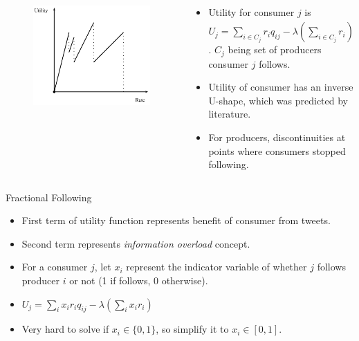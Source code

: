 \documentclass[aspectratio=169]{beamer}
\newcommand{\bi}{\begin{itemize}}
\newcommand{\ei}{\end{itemize}}
\begin{document}
\begin{frame}
\begin{columns}[T]
\begin{column}{0.2\textwidth}
\begin{figure}[!ht]
                \includegraphics[scale=0.1]{./figures/follow_celeb_utility.png}
            \end{figure}
        \end{column}
        \begin{column}{0.4\textwidth}
            \pause
            \bi
    \item Utility for consumer $j$ is $U_{j} = \sum_{i \in C_j}r_{i}q_{ij} - \lambda (\sum_{i
                \in C_{j}}r_{i})^2$. $C_j$ being set of producers consumer $j$ follows.
            \pause
        \item Utility of consumer has an inverse U-shape, which was predicted by
            literature.
            \pause
        \item For producers, discontinuities at points where consumers stopped
            following.
            \ei
        \end{column}
    \end{columns}
\end{frame}

\begin{frame}{Fractional Following}
    \bi
\item First term of utility function represents benefit of consumer from tweets.
    \pause
\item Second term represents \textit{information overload} concept.
    \pause
\item For a consumer $j$, let $x_i$ represent the indicator variable of whether
    $j$ follows producer $i$ or not (1 if follows, 0 otherwise).
    \pause
\item $U_j = \sum_{i}x_i r_i q_{ij} - \lambda (\sum_{i}x_i r_i)$
    \pause
\item Very hard to solve if $x_i \in \{0, 1\}$, so simplify it to $x_i \in [0,1]$.
    \ei
\end{frame}
\end{document}
